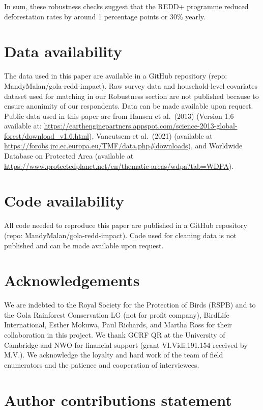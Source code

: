 \documentclass[
]{article}
\begin{document}
In sum, these robustness checks suggest that the REDD+ programme reduced
deforestation rates by around 1 percentage points or 30\% yearly.

\hypertarget{data-availability}{%
\section{Data availability}\label{data-availability}}

The data used in this paper are available in a GitHub repository (repo:
MandyMalan/gola-redd-impact). Raw survey data and household-level
covariates dataset used for matching in our Robustness section are not
published because to ensure anonimity of our respondents. Data can be
made available upon request. Public data used in this paper are from
Hansen et al.~(2013) (Version 1.6 available at:
\url{https://earthenginepartners.appspot.com/science-2013-global-forest/download_v1.6.html}),
Vancutsem et al.~(2021) (available at
\url{https://forobs.jrc.ec.europa.eu/TMF/data.php\#downloads}), and
Worldwide Database on Protected Area (available at
\url{https://www.protectedplanet.net/en/thematic-areas/wdpa?tab=WDPA}).

\hypertarget{code-availability}{%
\section{Code availability}\label{code-availability}}

All code needed to reproduce this paper are published in a GitHub
repository (repo: MandyMalan/gola-redd-impact). Code used for cleaning
data is not published and can be made available upon request.

\hypertarget{acknowledgements}{%
\section{Acknowledgements}\label{acknowledgements}}

We are indebted to the Royal Society for the Protection of Birds (RSPB)
and to the Gola Rainforest Conservation LG (not for profit company),
BirdLife International, Esther Mokuwa, Paul Richards, and Martha Ross
for their collaboration in this project. We thank GCRF QR at the
University of Cambridge and NWO for financial support (grant
VI.Vidi.191.154 received by M.V.). We acknowledge the loyalty and hard
work of the team of field enumerators and the patience and cooperation
of interviewees.

\hypertarget{author-contributions-statement}{%
\section{Author contributions
statement}\label{author-contributions-statement}}
\end{document}
